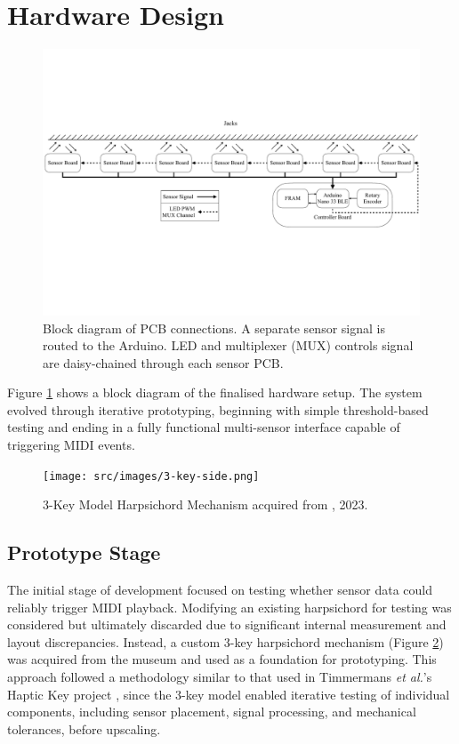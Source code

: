 \section{Hardware Design}\label{hardware-design}

\begin{figure}
    \centering
    \includegraphics[width=\linewidth]{src/images/block-diagram-2.pdf}
    \caption{Block diagram of PCB connections. A separate sensor signal is routed to the Arduino. LED and multiplexer (MUX) controls signal are daisy-chained through each sensor PCB.}
    \label{fig:system-block-diagram}
\end{figure}

Figure \ref{fig:system-block-diagram} shows a block diagram of the finalised hardware setup. 
The system evolved through iterative prototyping, beginning with simple threshold-based testing and ending in a fully functional multi-sensor interface capable of triggering MIDI events. 

\begin{figure}
    \centering    
    \texttt{[image: src/images/3-key-side.png]}
    \caption{3-Key Model Harpsichord Mechanism acquired from , 2023.}
    \label{fig:3key}
\end{figure}

\subsection{Prototype Stage}

The initial stage of development focused on testing whether sensor data could reliably trigger MIDI playback. Modifying an existing harpsichord for testing was considered but ultimately discarded due to significant internal measurement and layout discrepancies. Instead, a custom 3-key harpsichord mechanism (Figure \ref{fig:3key}) was acquired from the museum and used as a foundation for prototyping. This approach followed a methodology similar to that used in Timmermans \emph{et al.}'s Haptic Key project \cite{Timmermans2020}, since the 3-key model enabled iterative testing of individual components, including sensor placement, signal processing, and mechanical tolerances, before upscaling. 

